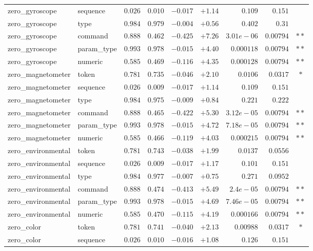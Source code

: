 \begin{table}[!htbp]
\begin{tabular}{l l r r r r r r c}
zero\_gyroscope & sequence & $0.026$ & $0.010$ & $-0.017$ & $+1.14$ & $0.109$ & $0.151$ &  \\
zero\_gyroscope & type & $0.984$ & $0.979$ & $-0.004$ & $+0.56$ & $0.402$ & $0.31$ &  \\
zero\_gyroscope & command & $0.888$ & $0.462$ & $-0.425$ & $+7.26$ & $3.01e-06$ & $0.00794$ & $\ast\ast$ \\
zero\_gyroscope & param\_type & $0.993$ & $0.978$ & $-0.015$ & $+4.40$ & $0.000118$ & $0.00794$ & $\ast\ast$ \\
zero\_gyroscope & numeric & $0.585$ & $0.469$ & $-0.116$ & $+4.35$ & $0.000128$ & $0.00794$ & $\ast\ast$ \\
zero\_magnetometer & token & $0.781$ & $0.735$ & $-0.046$ & $+2.10$ & $0.0106$ & $0.0317$ & $\ast$ \\
zero\_magnetometer & sequence & $0.026$ & $0.009$ & $-0.017$ & $+1.14$ & $0.109$ & $0.151$ &  \\
zero\_magnetometer & type & $0.984$ & $0.975$ & $-0.009$ & $+0.84$ & $0.221$ & $0.222$ &  \\
zero\_magnetometer & command & $0.888$ & $0.465$ & $-0.422$ & $+5.30$ & $3.12e-05$ & $0.00794$ & $\ast\ast$ \\
zero\_magnetometer & param\_type & $0.993$ & $0.978$ & $-0.015$ & $+4.72$ & $7.18e-05$ & $0.00794$ & $\ast\ast$ \\
zero\_magnetometer & numeric & $0.585$ & $0.466$ & $-0.119$ & $+4.03$ & $0.000215$ & $0.00794$ & $\ast\ast$ \\
zero\_environmental & token & $0.781$ & $0.743$ & $-0.038$ & $+1.99$ & $0.0137$ & $0.0556$ &  \\
zero\_environmental & sequence & $0.026$ & $0.009$ & $-0.017$ & $+1.17$ & $0.101$ & $0.151$ &  \\
zero\_environmental & type & $0.984$ & $0.977$ & $-0.007$ & $+0.75$ & $0.271$ & $0.0952$ &  \\
zero\_environmental & command & $0.888$ & $0.474$ & $-0.413$ & $+5.49$ & $2.4e-05$ & $0.00794$ & $\ast\ast$ \\
zero\_environmental & param\_type & $0.993$ & $0.978$ & $-0.015$ & $+4.69$ & $7.46e-05$ & $0.00794$ & $\ast\ast$ \\
zero\_environmental & numeric & $0.585$ & $0.470$ & $-0.115$ & $+4.19$ & $0.000166$ & $0.00794$ & $\ast\ast$ \\
zero\_color & token & $0.781$ & $0.741$ & $-0.040$ & $+2.13$ & $0.00988$ & $0.0317$ & $\ast$ \\
zero\_color & sequence & $0.026$ & $0.010$ & $-0.016$ & $+1.08$ & $0.126$ & $0.151$ &  \\

\end{tabular}
\end{table}
